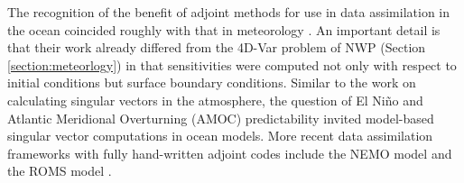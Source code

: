 The recognition of the benefit of adjoint methods for use in data assimilation in the ocean coincided roughly with that in meteorology \cite{Thacker:1988kp,Thacker:1988ed,Thacker:1989jf,Tziperman.1989,Tziperman:1992hg,Tziperman:1992jw}. 
An important detail is that their work already differed from the 4D-Var problem of NWP (Section \ref{section:meteorlogy}) in that sensitivities were computed not only with respect to initial conditions but surface boundary conditions.
Similar to the work on calculating singular vectors in the atmosphere, 
the question of El Ni\~no \cite{Moore.1997ah,Moore.1997}
and Atlantic Meridional Overturning (AMOC) \cite{Zanna.2010,Zanna:2011ge,Zanna:2012dw}
predictability invited model-based singular vector computations in ocean models. 
More recent data assimilation frameworks with fully hand-written adjoint codes include the NEMO model \cite{Weaver.2003,Vidard:2015kj} and the ROMS model \cite{Moore:2004fk,Moore:2011bc}.

